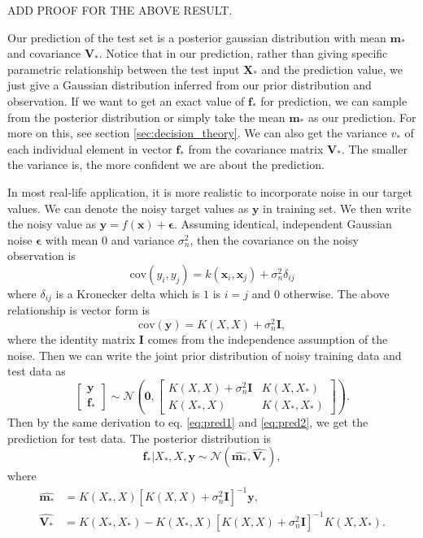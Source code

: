 \documentclass[12pt,a4paper]{article}
\theoremstyle{definition}
\numberwithin{equation}{section}
\let\vec\mathbf
\begin{document}
ADD PROOF FOR THE ABOVE RESULT.

Our prediction of the test set is a posterior gaussian distribution with mean $\vec m_*$ and covariance $\vec V_*$.  Notice that in our prediction, rather than giving specific parametric relationship between the test input $\vec X_*$ and the prediction value, we just give a Gaussian distribution inferred from our prior distribution and observation. If we want to get an exact value of $\vec f_*$ for prediction, we can sample from the posterior distribution or simply take the mean $\vec m_*$ as our prediction. For more on this, see section \ref{sec:decision_theory}. We can also get the variance $v_*$ of each individual element in vector  $\vec f_*$ from the covariance matrix $\vec V_*$. The smaller the variance is, the more confident we are about the prediction. 

In most real-life application, it is more realistic to incorporate noise in our target values. We can denote the noisy target values as $\vec y$ in training set. We then write the noisy value as $\vec y = f(\vec x) + \vec\epsilon$. Assuming identical, independent Gaussian noise $\vec \epsilon$ with mean $0$ and variance $\sigma^2_n$, then the covariance on the noisy observation is
\begin{equation*} \label{}
\mathrm{cov} (y_i,y_j) = k(\vec x_i,\vec x_j) + \sigma^2_n \delta_{ij}
\end{equation*}
where $\delta_{ij}$ is a Kronecker delta which is $1$ is $i=j$ and $0$ otherwise. The above relationship is vector form is
\begin{equation} \label{cov_y}
\mathrm{cov} (\vec y) = K(X,X) + \sigma^2_n \vec I,
\end{equation}
where the identity matrix $\vec I$ comes from the independence assumption of the noise. Then we can write the joint prior distribution of noisy training data and test data as
\begin{equation} \label{}
	\begin{bmatrix}
	\vec y\\
	\vec f_*
	\end{bmatrix}
	\sim
	\mathcal{N}\left(\vec 0, 
	\begin{bmatrix}
	K(X,X)+ \sigma^2_n \vec I & K(X,X_*)\\
	K(X_*,X) & K(X_*,X_*)
	\end{bmatrix}
	\right).
\end{equation}
Then by the same derivation to eq. \ref{eq:pred1} and \ref{eq:pred2}, we get the prediction for test data. The posterior distribution is 
\begin{equation} \label{eq:pred3}
	\vec f_* | X_*, X, \vec y \sim \mathcal N (\widehat{\vec m_*}, \widehat{\vec V_*}),
\end{equation}
where
\begin{equation} \label{eq:pred4}
\begin{split}
\widehat{\vec m_* }&= K(X_*,X)[K(X,X)+ \sigma^2_n \vec I]^{-1}\vec y,\\
\widehat{\vec V_*} &= K(X_*,X_*) - K(X_*,X)[K(X,X)+ \sigma^2_n \vec I]^{-1}K(X,X_*).
\end{split}
\end{equation}
\end{document}
